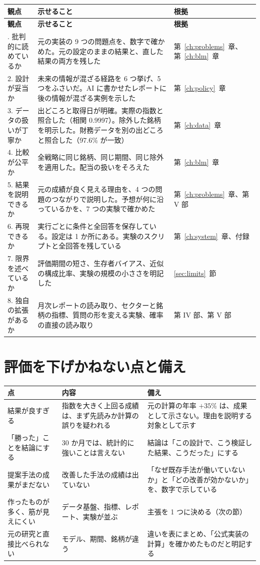 \documentclass[xelatex,ja=standard,jafont=hiragino-pron,a4paper,10pt]{bxjsreport}
\newcommand{\chapref}[1]{第~\ref{#1}~章}
\newcommand{\secref}[1]{\ref{#1}~節}
\begin{document}
\begin{longtable}{p{3.40cm}p{6.00cm}p{5.00cm}}
\toprule
\textbf{観点} & \textbf{示せること} & \textbf{根拠} \\
\midrule
\endfirsthead
\toprule
\textbf{観点} & \textbf{示せること} & \textbf{根拠} \\
\midrule
\endhead
\bottomrule
\endfoot
1. 批判的に読めているか & 元の実装の 9 つの問題点を、数字で確かめた。元の設定のままの結果と、直した結果の両方を残した & \chapref{ch:problems}、\chapref{ch:blm} \\
2. 設計が妥当か & 未来の情報が混ざる経路を 6 つ挙げ、5 つをふさいだ。AI に書かせたレポートに後の情報が混ざる実例を示した & \chapref{ch:policy} \\
3. データの扱いが丁寧か & 出どころと取得日が明確。実際の指数と照合した（相関 0.9997）。除外した銘柄を明示した。財務データを別の出どころと照合した（97.6\% が一致） & \chapref{ch:data} \\
4. 比較が公平か & 全戦略に同じ銘柄、同じ期間、同じ除外を適用した。配当の扱いをそろえた & \chapref{ch:blm} \\
5. 結果を説明できるか & 元の成績が良く見える理由を、4 つの問題のつながりで説明した。予想が何に沿っているかを、7 つの実験で確かめた & \chapref{ch:problems}、第 V 部 \\
6. 再現できるか & 実行ごとに条件と全回答を保存している。設定は 1 か所にある。実験のスクリプトと全回答を残している & \chapref{ch:system}、付録 \\
7. 限界を述べているか & 評価期間の短さ、生存者バイアス、近似の構成比率、実験の規模の小ささを明記した & \secref{sec:limits} \\
8. 独自の拡張があるか & 月次レポートの読み取り、セクターと銘柄の指標、質問の形を変える実験、確率の直接の読み取り & 第 IV 部、第 V 部 \\
\end{longtable}

\section{評価を下げかねない点と備え}

\begin{longtable}{p{4.20cm}p{5.00cm}p{5.20cm}}
\toprule
\textbf{点} & \textbf{内容} & \textbf{備え} \\
\midrule
\endfirsthead
\bottomrule
\endfoot
結果が良すぎる & 指数を大きく上回る成績は、まず先読みか計算の誤りを疑われる & 元の計算の年率 $+35\%$ は、成果として示さない。理由を説明する対象として示す \\
「勝った」ことを結論にする & 30 か月では、統計的に強いことは言えない & 結論は「この設計で、こう検証した結果、こうだった」にする \\
提案手法の成果がまだない & 改善した手法の成績は出ていない & 「なぜ既存手法が働いていないか」と「どの改善が効かないか」を、数字で示している \\
作ったものが多く、筋が見えにくい & データ基盤、指標、レポート、実験が並ぶ & 主張を 1 つに決める（次の節） \\
元の研究と直接比べられない & モデル、期間、銘柄が違う & 違いを表にまとめ、「公式実装の計算」を確かめたものだと明記する \\
\end{longtable}
\end{document}
